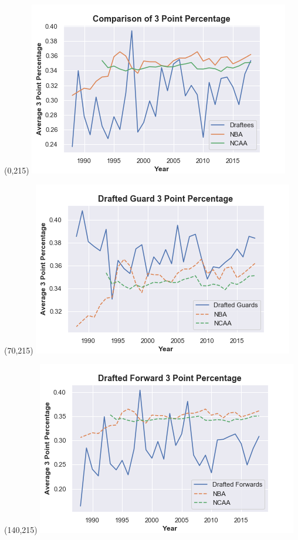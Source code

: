 \documentclass{article}
\begin{document}
\begin{textblock}{75}(0,215)
      \includegraphics[width=\linewidth]{3pt_comp.png}
    \end{textblock}
    
\begin{textblock}{75}(70,215)
      \includegraphics[width=\linewidth]{3pt_g.png}
    \end{textblock}

\begin{textblock}{75}(140,215)
      \includegraphics[width=\linewidth]{3pt_f.png}
    \end{textblock}
   
\end{document}
